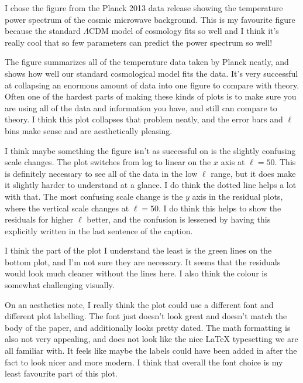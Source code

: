 \documentclass[11pt]{article}
\begin{document}
I chose the figure from the Planck 2013 data release showing the temperature power spectrum of the cosmic microwave background. This is my favourite figure because the standard $\Lambda$CDM model of cosmology fits so well and I think it's really cool that so few parameters can predict the power spectrum so well!

The figure summarizes all of the temperature data taken by Planck neatly, and shows how well our standard cosmological model fits the data. It's very successful at collapsing an enormous amount of data into one figure to compare with theory. Often one of the hardest parts of making these kinds of plots is to make sure you are using all of the data and information you have, and still can compare to theory. I think this plot collapses that problem neatly, and the error bars and $\ell$ bins make sense and are aesthetically pleasing.

I think maybe something the figure isn't as successful on is the slightly confusing scale changes. The plot switches from log to linear on the $x$ axis at $\ell = 50$. This is definitely necessary to see all of the data in the low $\ell$ range, but it does make it slightly harder to understand at a glance. I do think the dotted line helps a lot with that. The most confusing scale change is the $y$ axis in the residual plots, where the vertical scale changes at $\ell = 50$. I do think this helps to show the residuals for higher $\ell$ better, and the confusion is lessened by having this explicitly written in the last sentence of the caption.

I think the part of the plot I understand the least is the green lines on the bottom plot, and I'm not sure they are necessary. It seems that the residuals would look much cleaner without the lines here. I also think the colour is somewhat challenging visually.

On an aesthetics note, I really think the plot could use a different font and different plot labelling. The font just doesn't look great and doesn't match the body of the paper, and additionally looks pretty dated. The math formatting is also not very appealing, and does not look like the nice LaTeX typesetting we are all familiar with. It feels like maybe the labels could have been added in after the fact to look nicer and more modern. I think that overall the font choice is my least favourite part of this plot.
\end{document}
